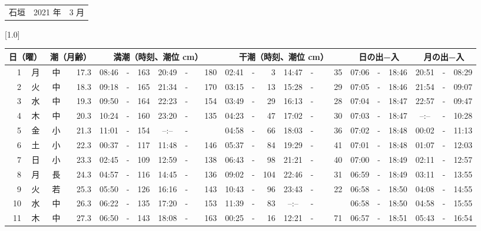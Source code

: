 \documentclass[12pt,a4j]{jsarticle}
\begin{document}
 \begin{table}[htbp]
 \begin{center}
 \begin{tabular}{lcc}
 \LARGE{石垣}  & \large{2021 年} & \large{ 3 月} \\
 \end{tabular}
 \end{center}
 \begin{center}
    \scalebox{0.7}[1.0]{
    \begin{tabular}{|rc|cr|ccrccr|ccrccr|ccc|ccc|}
    \hline
    \multicolumn{2}{|c|}{日（曜）} & \multicolumn{2}{c|}{潮（月齢）} & \multicolumn{6}{c|}{満潮（時刻、潮位 cm）} & \multicolumn{6}{c|}{干潮（時刻、潮位 cm）} & \multicolumn{3}{c|}{日の出−入} &  \multicolumn{3}{c|}{月の出−入}\\
 \hline
 1 & 月 & 中 & 17.3 &  08:46 &-& 163 &  20:49 &-& 180 &  02:41 &-&   3 &  14:47 &-&  35 & 07:06 & -& 18:46 & 20:51 & -& 08:29 \\
 2 & 火 & 中 & 18.3 &  09:18 &-& 165 &  21:34 &-& 170 &  03:15 &-&  13 &  15:28 &-&  29 & 07:05 & -& 18:46 & 21:54 & -& 09:07 \\
 3 & 水 & 中 & 19.3 &  09:50 &-& 164 &  22:23 &-& 154 &  03:49 &-&  29 &  16:13 &-&  28 & 07:04 & -& 18:47 & 22:57 & -& 09:47 \\
 4 & 木 & 中 & 20.3 &  10:24 &-& 160 &  23:20 &-& 135 &  04:23 &-&  47 &  17:02 &-&  30 & 07:03 & -& 18:47 & --:-- & -& 10:28 \\
 5 & 金 & 小 & 21.3 &  11:01 &-& 154 &  --:-- &-&~~~~~ &  04:58 &-&  66 &  18:03 &-&  36 & 07:02 & -& 18:48 & 00:02 & -& 11:13 \\
 6 & 土 & 小 & 22.3 &  00:37 &-& 117 &  11:48 &-& 146 &  05:37 &-&  84 &  19:29 &-&  41 & 07:01 & -& 18:48 & 01:07 & -& 12:03 \\
 7 & 日 & 小 & 23.3 &  02:45 &-& 109 &  12:59 &-& 138 &  06:43 &-&  98 &  21:21 &-&  40 & 07:00 & -& 18:49 & 02:11 & -& 12:57 \\
 8 & 月 & 長 & 24.3 &  04:57 &-& 116 &  14:45 &-& 136 &  09:02 &-& 104 &  22:46 &-&  31 & 06:59 & -& 18:49 & 03:11 & -& 13:55 \\
 9 & 火 & 若 & 25.3 &  05:50 &-& 126 &  16:16 &-& 143 &  10:43 &-&  96 &  23:43 &-&  22 & 06:58 & -& 18:50 & 04:08 & -& 14:55 \\
10 & 水 & 中 & 26.3 &  06:22 &-& 135 &  17:20 &-& 153 &  11:39 &-&  83 &  --:-- &-&~~~~~ & 06:58 & -& 18:50 & 04:58 & -& 15:55 \\
11 & 木 & 中 & 27.3 &  06:50 &-& 143 &  18:08 &-& 163 &  00:25 &-&  16 &  12:21 &-&  71 & 06:57 & -& 18:51 & 05:43 & -& 16:54 \\

\end{tabular}}
\end{center}
\end{table}
\end{document}
